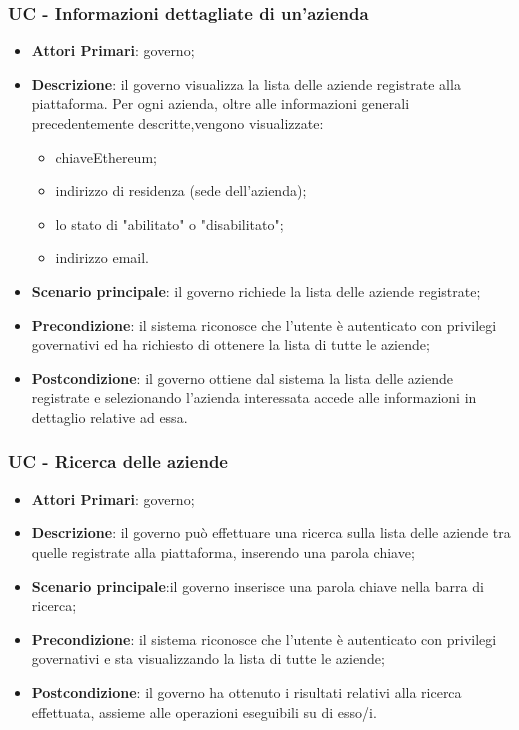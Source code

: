 \subsubsection{UC - Informazioni dettagliate di un'azienda}

\begin{itemize}
	\item \textbf{Attori Primari}: governo;
	\item \textbf{Descrizione}: il governo visualizza la lista delle aziende registrate alla piattaforma. Per ogni azienda, oltre alle informazioni generali precedentemente descritte,vengono visualizzate:
	\begin{itemize}
		\item chiave\glosp Ethereum\glo;
		\item indirizzo di residenza (sede dell'azienda);
		\item lo stato di "abilitato" o "disabilitato";
		\item indirizzo email.
	\end{itemize}
	
	\item \textbf{Scenario principale}: il governo richiede la lista delle aziende registrate;
	\item \textbf{Precondizione}: il sistema riconosce che l'utente è autenticato con privilegi governativi ed ha richiesto di ottenere la lista di tutte le aziende;
	\item \textbf{Postcondizione}: il governo ottiene dal sistema la lista delle aziende registrate e selezionando l'azienda interessata accede alle informazioni in dettaglio relative ad essa.
\end{itemize}

\subsubsection{UC - Ricerca delle aziende}
\begin{itemize}
	\item \textbf{Attori Primari}: governo;
	\item \textbf{Descrizione}:
	il governo può effettuare una ricerca sulla lista delle aziende tra quelle registrate alla piattaforma, inserendo una parola chiave;
	\item \textbf{Scenario principale}:il governo inserisce una parola chiave nella barra di ricerca;
	\item \textbf{Precondizione}: il sistema riconosce che l'utente è autenticato con privilegi governativi e sta visualizzando la lista di tutte le aziende;
	\item \textbf{Postcondizione}:
	il governo ha ottenuto i risultati relativi alla ricerca effettuata, assieme alle operazioni eseguibili su di esso/i.
\end{itemize}


